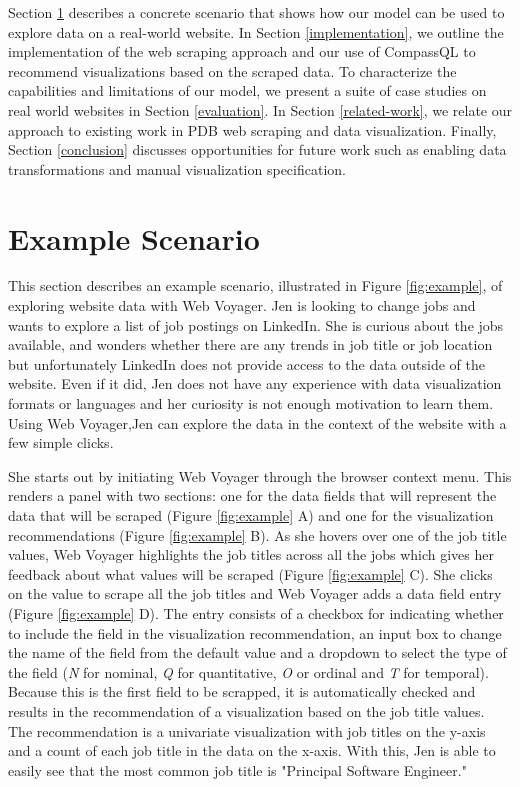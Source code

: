 \documentclass{vgtc}                          %
\begin{document}
Section \ref{demo} describes a concrete scenario that shows how our model can be used to explore data on a real-world website.
In Section \ref{implementation}, we outline the implementation of the web scraping approach and our use of CompassQL to recommend
visualizations based on the scraped data. To characterize the capabilities and limitations of our model, we present a suite of
case studies on real world websites in Section \ref{evaluation}. In Section \ref{related-work}, we relate our approach to existing
work in PDB web scraping and data visualization. Finally, Section \ref{conclusion} discusses opportunities for future work such
as enabling data transformations and manual visualization specification.

\section{Example Scenario} \label{demo}

This section describes an example scenario, illustrated in Figure \ref{fig:example}, of exploring website data with Web Voyager.
Jen is looking to change jobs and wants to explore a list of job postings on LinkedIn. She is curious about the jobs available, and
wonders whether there are any trends in job title or job location but unfortunately LinkedIn does not provide access to the data outside
of the website. Even if it did, Jen does not have any experience with data visualization formats or languages and her curiosity is not enough
motivation to learn them. Using Web Voyager,Jen can explore the data in the context of the website with a few simple clicks.

She starts out by initiating Web Voyager through the browser context menu. This renders a panel with two sections: one for the data fields
that will represent the data that will be scraped (Figure \ref{fig:example} A) and one for the visualization recommendations (Figure \ref{fig:example} B).
As she hovers over one of the job title values, Web Voyager highlights the job titles across all the jobs which gives her feedback about what values will
be scraped (Figure \ref{fig:example} C). She clicks on the value to scrape all the job titles and Web Voyager adds a data field entry (Figure \ref{fig:example} D). 
The entry consists of a checkbox for indicating whether to include the field in the visualization recommendation, an input box to change the name of the field
from the default value and a dropdown to select the type of the field (\emph{N} for nominal, \emph{Q} for quantitative, \emph{O} or ordinal and \emph{T} for temporal).
Because this is the first field to be scrapped, it is automatically checked and results in the recommendation of a visualization
based on the job title values. The recommendation is a univariate visualization with job titles on the y-axis and a count of each job title in the data on the x-axis.
With this, Jen is able to easily see that the most common job title is "Principal Software Engineer."
\end{document}
